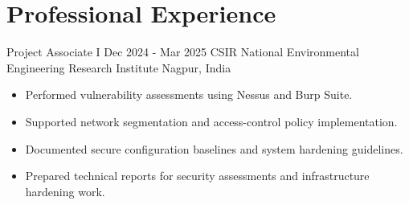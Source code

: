 \section{Professional Experience}
\cvrole
  {Project Associate I}
  {Dec 2024 - Mar 2025}
  {CSIR National Environmental Engineering Research Institute}
  {Nagpur, India}
\begin{itemize}
  \item Performed vulnerability assessments using Nessus and Burp Suite.
  \item Supported network segmentation and access-control policy implementation.
  \item Documented secure configuration baselines and system hardening guidelines.
  \item Prepared technical reports for security assessments and infrastructure hardening work.
\end{itemize}
